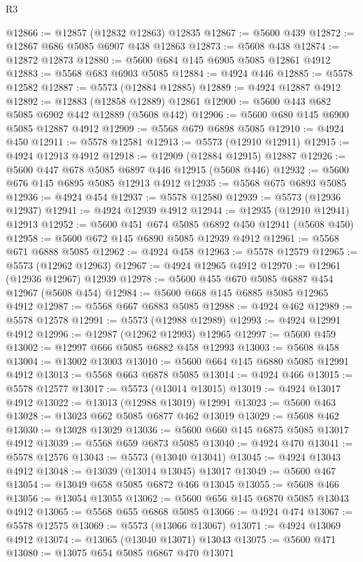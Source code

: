 \begin{lexlean}{R3}
\begin{coremodule}
@12866 := @12857 (@12832 @12863) @12835
@12867 := @5600 @439
@12872 := @12867 @686 @5085 @6907 @438 @12863
@12873 := @5608 @438
@12874 := @12872 @12873
@12880 := @5600 @684 @145 @6905 @5085 @12861 @4912
@12883 := @5568 @683 @6903 @5085
@12884 := @4924 @446
@12885 := @5578 @12582
@12887 := @5573 (@12884 @12885)
@12889 := @4924 @12887 @4912
@12892 := @12883 (@12858 @12889) @12861
@12900 := @5600 @443 @682 @5085 @6902 @442 @12889 (@5608 @442)
@12906 := @5600 @680 @145 @6900 @5085 @12887 @4912
@12909 := @5568 @679 @6898 @5085
@12910 := @4924 @450
@12911 := @5578 @12581
@12913 := @5573 (@12910 @12911)
@12915 := @4924 @12913 @4912
@12918 := @12909 (@12884 @12915) @12887
@12926 := @5600 @447 @678 @5085 @6897 @446 @12915 (@5608 @446)
@12932 := @5600 @676 @145 @6895 @5085 @12913 @4912
@12935 := @5568 @675 @6893 @5085
@12936 := @4924 @454
@12937 := @5578 @12580
@12939 := @5573 (@12936 @12937)
@12941 := @4924 @12939 @4912
@12944 := @12935 (@12910 @12941) @12913
@12952 := @5600 @451 @674 @5085 @6892 @450 @12941 (@5608 @450)
@12958 := @5600 @672 @145 @6890 @5085 @12939 @4912
@12961 := @5568 @671 @6888 @5085
@12962 := @4924 @458
@12963 := @5578 @12579
@12965 := @5573 (@12962 @12963)
@12967 := @4924 @12965 @4912
@12970 := @12961 (@12936 @12967) @12939
@12978 := @5600 @455 @670 @5085 @6887 @454 @12967 (@5608 @454)
@12984 := @5600 @668 @145 @6885 @5085 @12965 @4912
@12987 := @5568 @667 @6883 @5085
@12988 := @4924 @462
@12989 := @5578 @12578
@12991 := @5573 (@12988 @12989)
@12993 := @4924 @12991 @4912
@12996 := @12987 (@12962 @12993) @12965
@12997 := @5600 @459
@13002 := @12997 @666 @5085 @6882 @458 @12993
@13003 := @5608 @458
@13004 := @13002 @13003
@13010 := @5600 @664 @145 @6880 @5085 @12991 @4912
@13013 := @5568 @663 @6878 @5085
@13014 := @4924 @466
@13015 := @5578 @12577
@13017 := @5573 (@13014 @13015)
@13019 := @4924 @13017 @4912
@13022 := @13013 (@12988 @13019) @12991
@13023 := @5600 @463
@13028 := @13023 @662 @5085 @6877 @462 @13019
@13029 := @5608 @462
@13030 := @13028 @13029
@13036 := @5600 @660 @145 @6875 @5085 @13017 @4912
@13039 := @5568 @659 @6873 @5085
@13040 := @4924 @470
@13041 := @5578 @12576
@13043 := @5573 (@13040 @13041)
@13045 := @4924 @13043 @4912
@13048 := @13039 (@13014 @13045) @13017
@13049 := @5600 @467
@13054 := @13049 @658 @5085 @6872 @466 @13045
@13055 := @5608 @466
@13056 := @13054 @13055
@13062 := @5600 @656 @145 @6870 @5085 @13043 @4912
@13065 := @5568 @655 @6868 @5085
@13066 := @4924 @474
@13067 := @5578 @12575
@13069 := @5573 (@13066 @13067)
@13071 := @4924 @13069 @4912
@13074 := @13065 (@13040 @13071) @13043
@13075 := @5600 @471
@13080 := @13075 @654 @5085 @6867 @470 @13071

\end{coremodule}
\end{lexlean}
